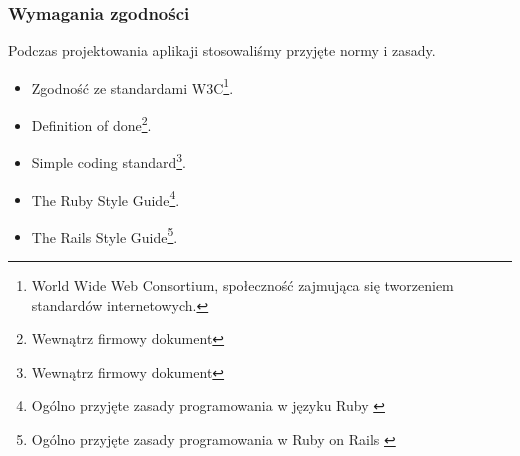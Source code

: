   \subsubsection{Wymagania zgodności}
    Podczas projektowania aplikaji stosowaliśmy przyjęte normy i zasady.
    \begin{itemize}
      \item Zgodność ze standardami W3C\footnote{World Wide Web Consortium, społeczność zajmująca się tworzeniem standardów internetowych.}.
      \item Definition of done\footnote{Wewnątrz firmowy dokument\cite{dod}}.
      \item Simple coding standard\footnote{Wewnątrz firmowy dokument\cite{scs}}.
      \item The Ruby Style Guide\footnote{Ogólno przyjęte zasady programowania w języku Ruby \cite{ruby_style_guide}}.
      \item The Rails Style Guide\footnote{Ogólno przyjęte zasady programowania w Ruby on Rails \cite{rails_style_guide}}.
    \end{itemize}
